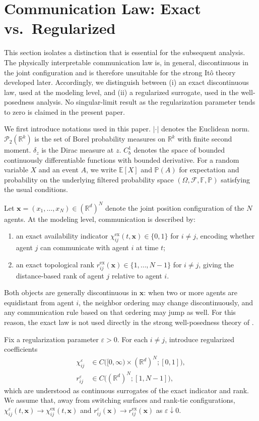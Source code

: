 \documentclass[pdflatex,sn-mathphys-num]{sn-jnl}%
\numberwithin{equation}{section}
\theoremstyle{thmstyleone}%
\theoremstyle{remark}
\theoremstyle{definition}
\newcommand{\R}{\mathbb{R}}
\newcommand{\E}{\mathbb{E}}
\newcommand{\Prob}{\mathbb{P}}
\newcommand{\calP}{\mathcal{P}}
\newcommand{\calF}{\mathcal{F}}
\begin{document}
\section{Communication Law: Exact vs.\ Regularized}
\label{sec:network}
This section isolates a distinction that is essential for the subsequent
analysis. The physically interpretable communication law is, in general,
discontinuous in the joint configuration and is therefore unsuitable for the
strong It\^o theory developed later. Accordingly, we distinguish between (i)
an exact discontinuous law, used at the modeling level, and (ii) a regularized surrogate, used in the well-posedness analysis. No
singular-limit result as the regularization parameter tends to zero is
claimed in the present paper.

We first introduce notations used in this paper. $|\cdot|$ denotes the
Euclidean norm. $\calP_2(\R^{k})$ is the set of Borel probability measures on
$\R^{k}$ with finite second moment. $\delta_z$ is the Dirac measure at $z$.
$C_b^1$ denotes the space of bounded continuously differentiable functions
with bounded derivative. For a random variable $X$ and an event $A$, we
write $\E[X]$ and $\Prob(A)$ for expectation and probability on the
underlying filtered probability space
$(\Omega,\calF,\mathbb{F},\Prob)$ satisfying the usual conditions.

Let $\mathbf{x}=(x_1,\dots,x_N)\in(\R^d)^N$ denote the joint position
configuration of the $N$ agents. At the modeling level, communication is
described by:
\begin{enumerate}[label=(\roman*)]
\item an exact availability indicator
$\chi_{ij}^{\mathrm{ex}}(t,\mathbf{x})\in\{0,1\}$ for $i\neq j$, encoding whether
agent $j$ can communicate with agent $i$ at time $t$;
\item an exact topological rank $r_{ij}^{\mathrm{ex}}(\mathbf{x})\in\{1,\dots,N-1\}$
for $i\neq j$, giving the distance-based rank of agent $j$ relative to
agent $i$.
\end{enumerate}
Both objects are generally discontinuous in $\mathbf{x}$: when two or more
agents are equidistant from agent $i$, the neighbor ordering may change
discontinuously, and any communication rule based on that ordering may jump
as well. For this reason, the
exact law is not used directly in the strong well-posedness theory of
.

Fix a regularization parameter $\varepsilon>0$. For each $i\neq j$, introduce
regularized coefficients
\begin{equation}
\begin{aligned}
  \chi_{ij}^{\varepsilon} &\in C\big([0,\infty)\times(\R^d)^N;[0,1]\big), \\[4pt]
  r_{ij}^{\varepsilon} &\in C\big((\R^d)^N;[1,N-1]\big),
\end{aligned}
\end{equation}
which are understood as continuous surrogates of the exact indicator and
rank. We assume that, away from switching surfaces and rank-tie
configurations,
$\chi_{ij}^{\varepsilon}(t,\mathbf{x}) \to \chi_{ij}^{\mathrm{ex}}(t,\mathbf{x})$ and
$r_{ij}^{\varepsilon}(\mathbf{x}) \to r_{ij}^{\mathrm{ex}}(\mathbf{x})$ as
$\varepsilon\downarrow 0$.
\end{document}
